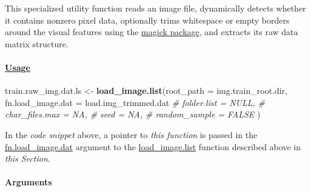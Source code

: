 \documentclass[
]{report}
\newenvironment{Shaded}{\begin{snugshade}}{\end{snugshade}}
\newcommand{\AttributeTok}[1]{\textcolor[rgb]{0.13,0.29,0.53}{#1}}
\newcommand{\CommentTok}[1]{\textcolor[rgb]{0.56,0.35,0.01}{\textit{#1}}}
\newcommand{\FunctionTok}[1]{\textcolor[rgb]{0.13,0.29,0.53}{\textbf{#1}}}
\newcommand{\NormalTok}[1]{#1}
\newcommand{\OtherTok}[1]{\textcolor[rgb]{0.56,0.35,0.01}{#1}}
\begin{document}
\hfill\break

This specialized utility function reads an image file, dynamically detects whether it contains nonzero pixel data, optionally trims whitespace or empty borders around the visual features using the \href{https://docs.ropensci.org/magick/index.html}{magick package}, and extracts its raw data matrix structure.

\protect{}\label{func.load.img_trimmed.dat.usage}
\paragraph{\texorpdfstring{\href{https://github.com/AzKurban-edX-DS/edx.capstone.choose-your-own/blob/main/r/support-scripts/ds.train2trimmed_img.dat.R\#L12}{Usage}}{Usage}}\label{usage-3}

\hfill\break

\begin{Shaded}
\begin{Highlighting}[]
\NormalTok{  train.raw\_img.dat.ls }\OtherTok{\textless{}{-}} \FunctionTok{load\_image.list}\NormalTok{(}\AttributeTok{root\_path =}\NormalTok{ img.train\_root.dir,}
                                        \AttributeTok{fn.load\_image.dat =}\NormalTok{ load.img\_trimmed.dat}
                                        \CommentTok{\# folder.list = NULL,}
                                        \CommentTok{\# char\_files.max = NA,}
                                        \CommentTok{\# seed = NA,}
                                        \CommentTok{\# random\_sample = FALSE}
\NormalTok{                                        )}
\end{Highlighting}
\end{Shaded}

\begin{noteblock}
In the \emph{code snippet} above, a pointer to \emph{this function} is passed in the \hyperref[func.load_image.list.args.fn.load_image.dat]{fn.load\_image.dat} argument to the \hyperref[func.load_image.list]{load\_image.list} function described above in \emph{this Section}.

\end{noteblock}

\protect{}\label{func.load.img_trimmed.dat.args}
\paragraph{Arguments}\label{arguments-3}

\hfill\break
\end{document}

